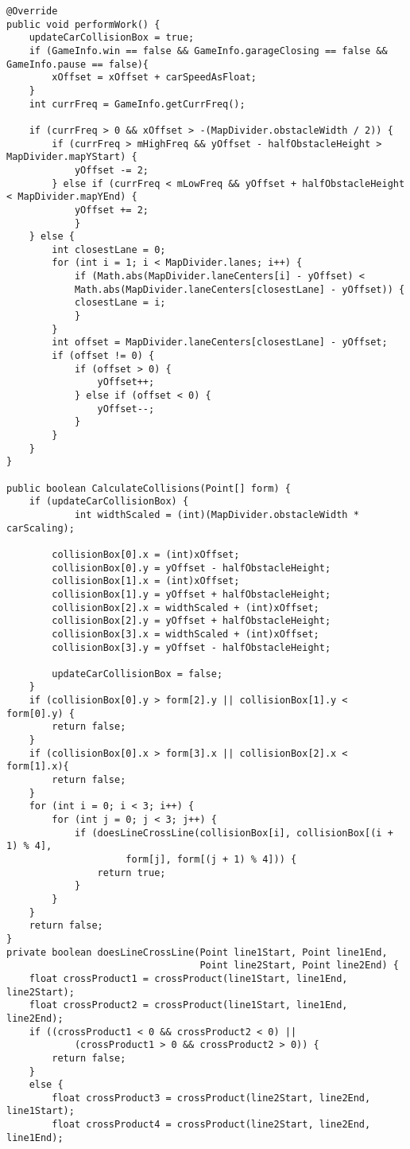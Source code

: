 \begin{lstlisting}[style=csharp,label=car_class, caption={Car class from the original Cars project.}]
@Override
public void performWork() {
	updateCarCollisionBox = true;
	if (GameInfo.win == false && GameInfo.garageClosing == false && GameInfo.pause == false){
		xOffset = xOffset + carSpeedAsFloat;
	}
	int currFreq = GameInfo.getCurrFreq();
		
	if (currFreq > 0 && xOffset > -(MapDivider.obstacleWidth / 2)) {
		if (currFreq > mHighFreq && yOffset - halfObstacleHeight > MapDivider.mapYStart) {
			yOffset -= 2;
		} else if (currFreq < mLowFreq && yOffset + halfObstacleHeight < MapDivider.mapYEnd) {
			yOffset += 2;
			}
 	} else {
 		int closestLane = 0;
 		for (int i = 1; i < MapDivider.lanes; i++) {
 			if (Math.abs(MapDivider.laneCenters[i] - yOffset) <
 			Math.abs(MapDivider.laneCenters[closestLane] - yOffset)) {
 			closestLane = i;
 			}
 		}
 		int offset = MapDivider.laneCenters[closestLane] - yOffset;
		if (offset != 0) {
			if (offset > 0) {
				yOffset++;
			} else if (offset < 0) {
				yOffset--;
			}
		}
	}
}
		
public boolean CalculateCollisions(Point[] form) {
	if (updateCarCollisionBox) {
			int widthScaled = (int)(MapDivider.obstacleWidth * carScaling);
			
		collisionBox[0].x = (int)xOffset;
		collisionBox[0].y = yOffset - halfObstacleHeight;
		collisionBox[1].x = (int)xOffset;
		collisionBox[1].y = yOffset + halfObstacleHeight;
		collisionBox[2].x = widthScaled + (int)xOffset;
		collisionBox[2].y = yOffset + halfObstacleHeight;
		collisionBox[3].x = widthScaled + (int)xOffset;
		collisionBox[3].y = yOffset - halfObstacleHeight;
		
		updateCarCollisionBox = false;
	}
	if (collisionBox[0].y > form[2].y || collisionBox[1].y < form[0].y) {
		return false;
	}
	if (collisionBox[0].x > form[3].x || collisionBox[2].x < form[1].x){
		return false;
	}		
	for (int i = 0; i < 3; i++) {
		for (int j = 0; j < 3; j++) {
			if (doesLineCrossLine(collisionBox[i], collisionBox[(i + 1) % 4],
					 form[j], form[(j + 1) % 4])) {
				return true;
			}
		}
	}		
	return false;
}
private boolean doesLineCrossLine(Point line1Start, Point line1End,
								  Point line2Start, Point line2End) {
	float crossProduct1 = crossProduct(line1Start, line1End, line2Start);
	float crossProduct2 = crossProduct(line1Start, line1End, line2End);
	if ((crossProduct1 < 0 && crossProduct2 < 0) ||
			(crossProduct1 > 0 && crossProduct2 > 0)) {
		return false;
	}
	else {
		float crossProduct3 = crossProduct(line2Start, line2End, line1Start);
		float crossProduct4 = crossProduct(line2Start, line2End, line1End);
			

\end{lstlisting}
